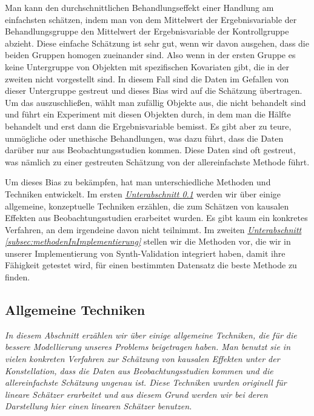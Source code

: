 \documentclass[12pt,a4paper,twoside]{scrartcl}
\numberwithin{equation}{section}
\begin{document}
Man kann den durchschnittlichen Behandlungseffekt einer Handlung am einfachsten schätzen, indem man von dem Mittelwert der Ergebnisvariable der Behandlungsgruppe den Mittelwert der Ergebnisvariable der Kontrollgruppe abzieht. Diese einfache Schätzung ist sehr gut, wenn wir davon ausgehen, dass die beiden Gruppen homogen zueinander sind. Also wenn in der ersten Gruppe es keine Untergruppe von Objekten mit spezifischen Kovariaten gibt, die in der zweiten nicht vorgestellt sind. In diesem Fall sind die Daten im Gefallen von dieser Untergruppe gestreut und dieses Bias wird auf die Schätzung übertragen. Um das auszuschließen, wählt man zufällig Objekte aus, die nicht behandelt sind und führt ein Experiment mit diesen Objekten durch, in dem man die Hälfte behandelt und erst dann die Ergebnisvariable bemisst. Es gibt aber zu teure, unmögliche oder unethische Behandlungen, was dazu führt, dass die Daten darüber nur aus Beobachtungsstudien kommen. Diese Daten sind oft gestreut, was nämlich zu einer gestreuten Schätzung von der allereinfachste Methode führt\cite{cox1982biometrics}.\par 

\noindent
Um dieses Bias zu bekämpfen, hat man unterschiedliche Methoden und Techniken entwickelt. Im ersten  \emph{\hyperref[subsec:allgemeineTechniken]{Unterabschnitt \ref{subsec:allgemeineTechniken}}} werden wir über einige allgemeine, konzeptuelle Techniken erzählen, die zum Schätzen von kausalen Effekten aus Beobachtungsstudien erarbeitet wurden. Es gibt kaum ein konkretes Verfahren, an dem irgendeine davon nicht teilnimmt. Im zweiten \emph{\hyperref[subsec:methodenInImplementierung]{Unterabschnitt \ref{subsec:methodenInImplementierung}}} stellen wir die Methoden vor, die wir in unserer Implementierung von Synth-Validation integriert haben, damit ihre Fähigkeit getestet wird, für einen bestimmten Datensatz die beste Methode zu finden.\par 
  
\subsection{Allgemeine Techniken}\label{subsec:allgemeineTechniken} 
\noindent
\emph{In diesem Abschnitt erzählen wir über einige allgemeine Techniken, die für die bessere Modellierung unseres Problems beigetragen haben. Man benutzt sie in vielen konkreten Verfahren zur Schätzung von kausalen Effekten unter der Konstellation, dass die Daten aus Beobachtungsstudien kommen und die allereinfachste Schätzung ungenau ist. Diese Techniken wurden originell für lineare Schätzer erarbeitet und aus diesem Grund werden wir bei deren Darstellung hier einen linearen Schätzer benutzen.}
\par
 
\end{document}
